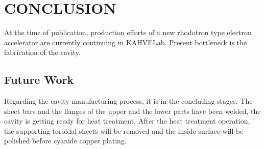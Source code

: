 \documentclass[a4paper,oneside,12pt]{report}
\numberwithin{equation}{chapter}
\begin{document}


\tableofcontents


\newcommand{\vecthreeBF}[1]{\vec{\textbf{#1}}}
\newcommand{\vecthree}[1]{\vec{#1}}

\newcommand{\parDeriv}[2]{\frac{\partial #1}{\partial #2}}
\newcommand{\parDerivS}[2]{\frac{\partial^2 #1}{\partial #2^2}}
\newcommand{\derivS}[2]{\frac{d^2 #1}{d#2^2}}

\newcommand{\dotProdBF}[2]{\vecthreeBF{#1} \cdot \vecthreeBF{#2}}
\newcommand{\dotProd}[2]{\vecthree{#1} \cdot \vecthree{#2}}

\newcommand{\crossProdBF}[2]{\vecthreeBF{#1} \times \vecthreeBF{#2}}
\newcommand{\crossProd}[2]{\vecthree{#1} \times \vecthree{#2}}


\newcommand{\fromeq}[1]{\textit{equation \ref{eq:#1}}}
\newcommand{\fromeqs}[2]{\textit{equations \ref{eq:#1} and \ref{eq:#2}}}
\newcommand{\fromeqsth}[3]{\textit{equations \ref{eq:#1}, \ref{eq:#2} and \ref{eq:#3}}}

\newcommand{\fromfig}[1]{\textit{figure \ref{fig:#1}}}
\newcommand{\fromfigs}[2]{\textit{figures \ref{fig:#1} and \ref{fig:#2}}}

\newcommand{\fromsec}[1]{\textit{section \ref{sec:#1}}}
\newcommand{\fromsecs}[2]{\textit{sections \ref{sec:#1} and \ref{sec:#2}}}

\newcommand{\e}{$\textbf{e}^-$ }
\newcommand{\egun}{$\textbf{e}^-$-gun }
\newcommand{\eB}{$\textbf{e}^-$ - $\vecthreeBF{B}$ }
\newcommand{\eE}{$\textbf{e}^-$ - $\vecthreeBF{E}$ }
\newcommand{\eEM}{$\textbf{e}^-$ - \textbf{EM} }
\newcommand{\ee}{$\textbf{e}^-$ - $\textbf{e}^-$ }


\chapter{CONCLUSION}
At the time of publication, production efforts of a new rhodotron type electron accelerator are currently continuing in KAHVELab. 
Present bottleneck is the fabrication of the cavity.

\section{Future Work}
Regarding the cavity manufacturing process, it is in the concluding stages.
The sheet bars and the flanges of the upper and the lower parts have been welded, the cavity is getting ready for heat treatment.
After the heat treatment operation, the supporting toroidal sheets will be removed and the inside surface will be polished before cyanide copper plating. 
\end{document}
